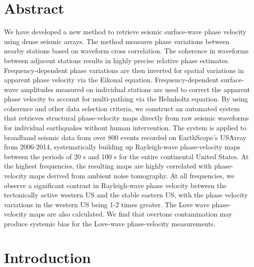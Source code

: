 
\section*{Abstract}

We have developed a new method to retrieve seismic surface-wave phase velocity using dense seismic arrays. The method measures phase variations between nearby stations based on waveform cross correlation. The coherence in waveforms between adjacent stations results in highly precise relative phase estimates.  Frequency-dependent phase variations are then inverted for spatial variations in apparent phase velocity via the Eikonal equation. Frequency-dependent surface-wave amplitudes measured on individual stations are used to correct the apparent phase velocity to account for multi-pathing via the Helmholtz equation.  By using coherence and other data selection criteria, we construct an automated system that retrieves structural phase-velocity maps directly from raw seismic waveforms for individual earthquakes without human intervention. The system is applied to broadband seismic data from over 800 events recorded on EarthScope's USArray from 2006-2014, systematically building up Rayleigh-wave phase-velocity maps between the periods of 20 s and 100 s for the entire continental United States.  At the highest frequencies, the resulting maps are highly correlated with phase-velocity maps derived from ambient noise tomography.  At all frequencies, we observe a significant contrast in Rayleigh-wave phase velocity between the tectonically active western US and the stable eastern US, with the phase velocity variations in the western US being 1-2 times greater. The Love wave phase-velocity maps are also calculated. We find that overtone contamination may produce systemic bias for the Love-wave phase-velocity measurements.


\section{Introduction}

